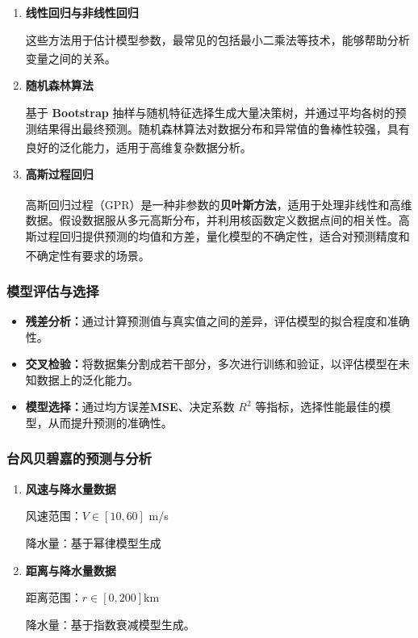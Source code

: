 \documentclass[withoutpreface,bwprint]{cumcmthesis}
\begin{document}
\begin{enumerate}
    \item[(1)] \textbf{线性回归与非线性回归}

                这些方法用于估计模型参数，最常见的包括最小二乘法等技术，能够帮助分析变量之间的关系\textsuperscript{\cite{motulsky2004fitting}}。
    \item[(2)] \textbf{随机森林算法}

                基于 \textbf{Bootstrap} 抽样与随机特征选择生成大量决策树，并通过平均各树的预测结果得出最终预测。随机森林算法对数据分布和异常值的鲁棒性较强，具有良好的泛化能力，适用于高维复杂数据分析\textsuperscript{\cite{freund1997decision}}。

    \item[(3)] \textbf{高斯过程回归}

                高斯回归过程（GPR）是一种非参数的\textbf{贝叶斯方法}\textsuperscript{\cite{williams2006gaussian}}，适用于处理非线性和高维数据。假设数据服从多元高斯分布，并利用核函数定义数据点间的相关性。高斯过程回归提供预测的均值和方差，量化模型的不确定性，适合对预测精度和不确定性有要求的场景\textsuperscript{\cite{schulz2018tutorial}}。               
\end{enumerate}

\subsubsection{模型评估与选择}

\begin{itemize}
    \item \textbf{残差分析：}通过计算预测值与真实值之间的差异，评估模型的拟合程度和准确性。

    \item \textbf{交叉检验：}将数据集分割成若干部分，多次进行训练和验证，以评估模型在未知数据上的泛化能力。

    \item \textbf{模型选择：}通过均方误差\textbf{MSE}、决定系数 $R^2$ 等指标，选择性能最佳的模型，从而提升预测的准确性。
\end{itemize}

\subsubsection{台风贝碧嘉的预测与分析}

\begin{enumerate}
    \item[(1)] \textbf{风速与降水量数据}

                风速范围：$V \in [10, 60]$ m/s

                降水量：基于幂律模型生成

                
    \item[(2)] \textbf{距离与降水量数据}

                距离范围：$r \in [0, 200]$km 

                降水量：基于指数衰减模型生成。
               
\end{enumerate}
\end{document}

